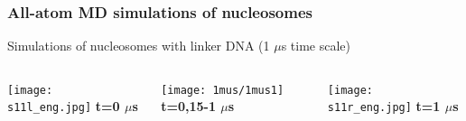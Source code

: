 \begin{frame}
\frametitle{All-atom MD simulations of nucleosomes}
Simulations of nucleosomes with linker DNA (1 $\mu$s time scale)
\begin{columns}[b]
\begin{column}{0.37\textwidth}
\begin{center}
\texttt{[image: s11l\_eng.jpg]}
\textbf{t=0 $\mu$s}
\end{center}
\end{column}
\begin{column}{0.32\textwidth}  %
\begin{center}
\ifdefined\HANDOUT
\texttt{[image: 1mus/1mus1]}
\else
{}
\fi
\textbf{t=0,15-1 $\mu$s}
\end{center}
\end{column}
\begin{column}{0.31\textwidth}  %
\begin{center}
\texttt{[image: s11r\_eng.jpg]}
\textbf{t=1 $\mu$s}
\end{center}
\end{column}
\end{columns}




\end{frame}
